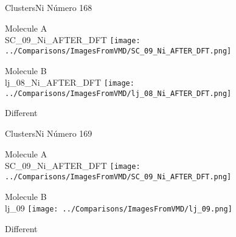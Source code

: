  \newpage

\vtab[-3cm]
\begin{center}
{\large ClustersNi \tab Número 168}
\end{center}
\begin{multicols}{2}
\begin{center}
Molecule A \\ 
SC\_09\_Ni\_AFTER\_DFT
\texttt{[image: ../Comparisons/ImagesFromVMD/SC\_09\_Ni\_AFTER\_DFT.png]}
\\
\vtab

\columnbreak
Molecule B \\ 
lj\_08\_Ni\_AFTER\_DFT
\texttt{[image: ../Comparisons/ImagesFromVMD/lj\_08\_Ni\_AFTER\_DFT.png]}
\\
\vtab


\end{center}
\end{multicols}
\begin{center}
\textcolor{NavyBlue}{\Large Different}
\end{center}

 \newpage

\vtab[-3cm]
\begin{center}
{\large ClustersNi \tab Número 169}
\end{center}
\begin{multicols}{2}
\begin{center}
Molecule A \\ 
SC\_09\_Ni\_AFTER\_DFT
\texttt{[image: ../Comparisons/ImagesFromVMD/SC\_09\_Ni\_AFTER\_DFT.png]}
\\
\vtab

\columnbreak
Molecule B \\ 
lj\_09
\texttt{[image: ../Comparisons/ImagesFromVMD/lj\_09.png]}
\\
\vtab


\end{center}
\end{multicols}
\begin{center}
\textcolor{NavyBlue}{\Large Different}
\end{center}

 \newpage

